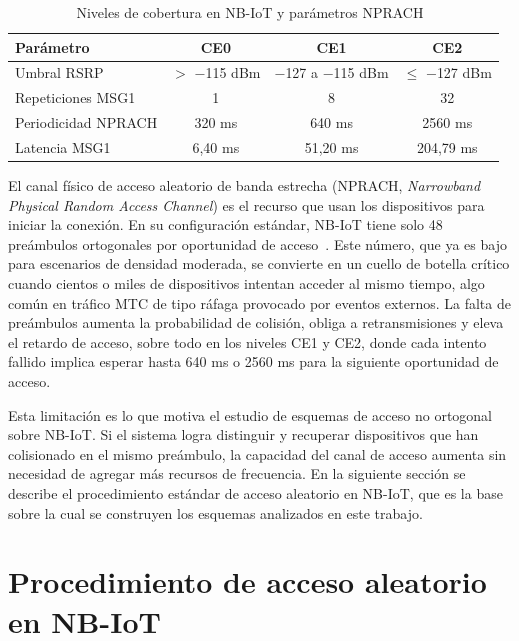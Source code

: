 \begin{table}[h!]
\centering
\caption{Niveles de cobertura en NB-IoT y parámetros NPRACH~\cite{ref7}}
\label{tab:ce_params}
\begin{tabular}{|l|c|c|c|}
\hline
\textbf{Parámetro} & \textbf{CE0} & \textbf{CE1} & \textbf{CE2} \\
\hline
Umbral RSRP & $>$ $-$115 dBm & $-$127 a $-$115 dBm & $\leq$ $-$127 dBm \\
Repeticiones MSG1 & 1 & 8 & 32 \\
Periodicidad NPRACH & 320 ms & 640 ms & 2560 ms \\
Latencia MSG1 & 6{,}40 ms & 51{,}20 ms & 204{,}79 ms \\
\hline
\end{tabular}
\end{table}

El canal físico de acceso aleatorio de banda estrecha (NPRACH,
\textit{Narrowband Physical Random Access Channel}) es el recurso que usan los dispositivos
para iniciar la conexión. En su configuración estándar, NB-IoT tiene solo 48 preámbulos
ortogonales por oportunidad de acceso~\cite{ref4}. Este número, que ya es bajo para escenarios
de densidad moderada, se convierte en un cuello de botella crítico cuando cientos o miles de
dispositivos intentan acceder al mismo tiempo, algo común en tráfico MTC de tipo ráfaga
provocado por eventos externos. La falta de preámbulos aumenta la probabilidad de colisión,
obliga a retransmisiones y eleva el retardo de acceso, sobre todo en los niveles CE1 y CE2,
donde cada intento fallido implica esperar hasta 640 ms o 2560 ms para la siguiente
oportunidad de acceso.

Esta limitación es lo que motiva el estudio de esquemas de acceso no ortogonal sobre NB-IoT.
Si el sistema logra distinguir y recuperar dispositivos que han colisionado en el mismo
preámbulo, la capacidad del canal de acceso aumenta sin necesidad de agregar más recursos de
frecuencia. En la siguiente sección se describe el procedimiento estándar de acceso aleatorio
en NB-IoT, que es la base sobre la cual se construyen los esquemas analizados en este
trabajo.


\section{Procedimiento de acceso aleatorio en NB-IoT}

